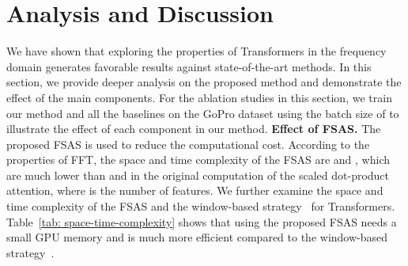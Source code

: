 \documentclass[10pt,twocolumn,letterpaper]{article}
\begin{document}
\begin{table}[!t]
  \caption{Quantitative evaluations of each component in the proposed method on the GoPro dataset~\cite{GoPro}.
  }
   \vspace{-3mm}
   \label{tab: effect-of-fsas}
\footnotesize
{}
\vspace{-5mm}
\end{table}


\vspace{-1mm}
\section{Analysis and Discussion}
\vspace{-1mm}
\label{sec:Ablation}
We have shown that exploring the properties of Transformers in the frequency domain generates favorable results against state-of-the-art methods.
In this section, we provide deeper analysis on the proposed method and demonstrate the effect of the main components.
For the ablation studies in this section, we train our method and all the baselines on the GoPro dataset using the batch size of  to illustrate the effect of each component in our method.
\vspace{-2mm}
{\flushleft \textbf{Effect of FSAS.}}
The proposed FSAS is used to reduce the computational cost. According to the properties of FFT, the space and time complexity of the FSAS are  and ,
which are much lower than  and  in the original computation of the scaled dot-product attention, where  is the number of features.
We further examine the space and time complexity of the FSAS and the window-based strategy~\cite{Swin,Uformer} for Transformers.
Table~\ref{tab: space-time-complexity} shows that using the proposed FSAS needs a small GPU memory and is much more efficient compared to the window-based strategy~\cite{Uformer}.
\end{document}
